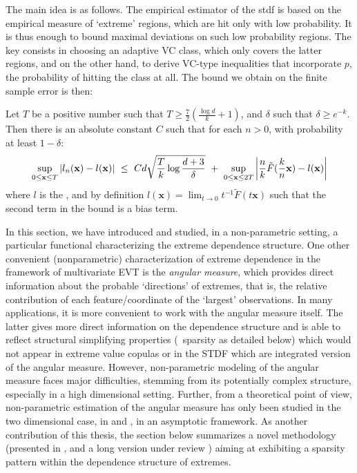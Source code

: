 The main idea is as follows. The empirical estimator of the {\sc stdf} is based on the empirical measure of `extreme' regions, which  are hit only with  low probability. It is thus enough to bound  maximal deviations on such low probability regions. 
 The key consists in choosing an adaptive VC class, which only covers the latter regions, and on the other hand, to derive VC-type inequalities that incorporate $p$, the probability of hitting the class at all. The bound we obtain on the finite sample error is then:

\begin{theorem}
\label{thm:l}
Let $T$ be a positive number such that $T \ge \frac{7}{2}(\frac{\log d}{k} + 1)$, and $\delta$ such that $\delta \ge e^{-k}$. Then there is an absolute constant $C$ such that for each $n >0$, with probability at least $1-\delta$:
\begin{align*}
\sup_{0 \le \mathbf{x} \le T} \left| l_n(\mathbf{x}) - l(\mathbf{x})
\right| ~\le~ Cd\sqrt{\frac{T}{k}\log\frac{d+3}{\delta}} ~+~ \sup_{0
  \le \mathbf{x} \le 2T}\left|\frac{n}{k} \tilde
  F(\frac{k}{n}\mathbf{x})- %
l(\mb x)\right|
\end{align*}
where $l$ is the \stdf, and by definition $l(\mathbf{x})= \lim_{t \to 0} t^{-1} \tilde F (t\mathbf{x}) $ such that the second term in the bound is a bias term.
\end{theorem}


In this section, we have introduced and studied, in a non-parametric setting, a particular functional characterizing the extreme dependence structure.
%
One other convenient (nonparametric) characterization of  extreme dependence in the framework of multivariate EVT is the \textit{angular measure}, which provides direct information about the probable `directions' of extremes, that is, the relative contribution of each feature/coordinate of the `largest' observations.
%
In many applications, it is more convenient to work with the angular measure itself. The latter gives more direct information on the dependence structure and is able to reflect structural simplifying properties (\eg~sparsity as detailed below) which would not appear in extreme value copulas or in the STDF which are integrated version of the angular measure.
However, non-parametric modeling of the angular measure faces major difficulties, stemming from its potentially complex structure, especially in a high dimensional setting.
Further, from a theoretical point of view, non-parametric estimation of the angular measure has only been studied in the two dimensional case, in \cite{Einmahl2001} and \cite{Einmahl2009}, in an asymptotic framework. As another contribution of this thesis, the section below summarizes a novel methodology (presented in \cite{AISTAT16}, \cite{NIPSWORKSHOP15} and a long version under review \cite{ARXIV16}) aiming at exhibiting a sparsity pattern within the dependence structure of extremes.



